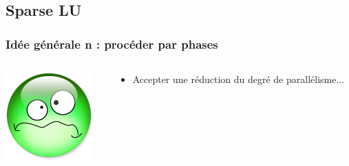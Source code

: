 \documentclass[xcolor={x11names,svgnames}]{beamer}
\begin{document}

\subsection{Sparse LU}


\begin{frame}
  \frametitle{Idée générale n : procéder par \og phases\fg{}}

  \begin{columns}[c]
    \begin{column}{.1\textwidth}
      \vspace{1mm}
      \includegraphics[width=\textwidth]{triste.png}
    \end{column}
    
    \begin{column}{.9\textwidth}
      \begin{itemize}
      \item Accepter une réduction du degré de parallélisme...
      \end{itemize}
    \end{column}
  \end{columns}


\end{frame}
\end{document}
